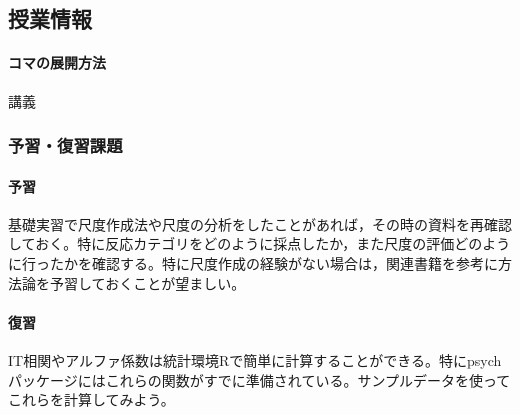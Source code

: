 \subsection{授業情報}
\paragraph{コマの展開方法}
講義
\subsubsection{予習・復習課題}
\paragraph{予習}基礎実習で尺度作成法や尺度の分析をしたことがあれば，その時の資料を再確認しておく。特に反応カテゴリをどのように採点したか，また尺度の評価どのように行ったかを確認する。特に尺度作成の経験がない場合は，関連書籍\citet{}を参考に方法論を予習しておくことが望ましい。
\paragraph{復習}IT相関やアルファ係数は統計環境Rで簡単に計算することができる。特にpsychパッケージにはこれらの関数がすでに準備されている。サンプルデータを使ってこれらを計算してみよう。
